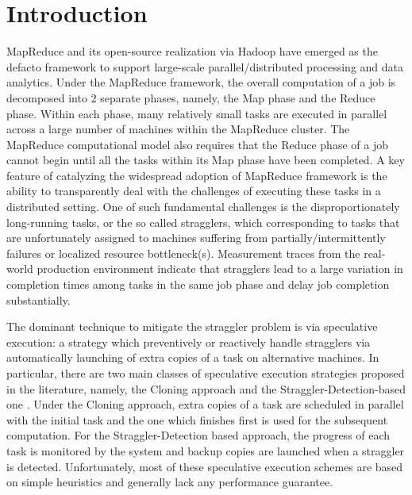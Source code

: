\documentclass[10pt,conference,compsocconf,letterpaper]{IEEEtran}
\begin{document}
\section{Introduction}
\label{Introduction}
MapReduce \cite{mapreduce:google} and its open-source realization via Hadoop \cite{hadoop} have emerged as the defacto framework  to support large-scale parallel/distributed processing and data analytics.
Under the  MapReduce framework, the overall computation of a job  is decomposed into 2 separate phases, namely, the Map phase and the Reduce phase. Within each phase, many relatively small tasks are executed in parallel across a large number of  machines within the MapReduce cluster. The MapReduce computational model also requires that the Reduce phase of a job cannot begin until all the tasks within its Map phase have been completed.  A key feature of catalyzing the widespread adoption of MapReduce framework is the ability to transparently deal with the challenges
of executing these tasks in a distributed setting.  One of such fundamental challenges is the disproportionately long-running tasks, or the so called stragglers, which corresponding to tasks that are unfortunately assigned to machines suffering from partially/intermittently failures or localized resource bottleneck(s).  Measurement traces from the real-world production environment   \cite{Outliers} indicate that stragglers lead to a large variation in completion times among tasks in the same job phase and delay job completion 
substantially.



The dominant technique to mitigate the straggler problem is via speculative execution: a strategy which preventively or
reactively handle stragglers via automatically launching of extra copies of a task on alternative machines.
In particular, there are two main classes
of speculative execution strategies proposed in the literature, namely, the Cloning approach  \cite{Cloning} and the Straggler-Detection-based one  \cite{hadoop,Dryad,Performance,Outliers,Smart_Speculative}.
Under the Cloning approach, extra copies of
a task are scheduled in parallel with the initial task and the one which finishes first is used for the subsequent computation. For the Straggler-Detection based
approach, the progress of each task is monitored by the
system and backup copies are launched when a straggler is
detected. Unfortunately,
most of these speculative execution schemes are based
on simple heuristics and generally lack any performance guarantee.
\end{document}
